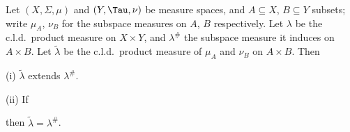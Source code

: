   Let $(X,\Sigma,\mu)$ and $(Y,\Tau,\nu)$
be measure spaces, and $A\subseteq X$, $B\subseteq Y$ subsets;  write
$\mu_A$, $\nu_B$ for the subspace measures on $A$, $B$ respectively.
Let $\lambda$ be the c.l.d.\ product measure on $X\times Y$, and
$\lambda^{\#}$
the subspace measure it induces on $A\times B$.   Let $\tilde\lambda$ be
the c.l.d.\ product measure of $\mu_A$ and $\nu_B$ on $A\times B$.   Then

(i) $\tilde\lambda$ extends $\lambda^{\#}$.

(ii) If




\noindent then $\tilde\lambda=\lambda^{\#}$.

